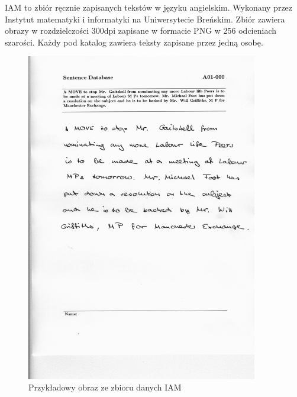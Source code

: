 IAM to zbiór ręcznie zapisanych tekstów w języku angielskim. 
Wykonany przez Instytut matematyki i informatyki na Uniwersytecie Breńskim.\cite{marti2002}
Zbiór zawiera obrazy w rozdzielczości 300dpi zapisane w formacie PNG w 256 odcieniach szarości.
Każdy pod katalog zawiera teksty zapisane przez jedną osobę.

\begin{figure}[H]
    \centering
    \includegraphics[width=0.9\textwidth]{images/a01-000u.png}
    \caption{Przykładowy obraz ze zbioru danych IAM}\label{fig:example_iam}
\end{figure}
